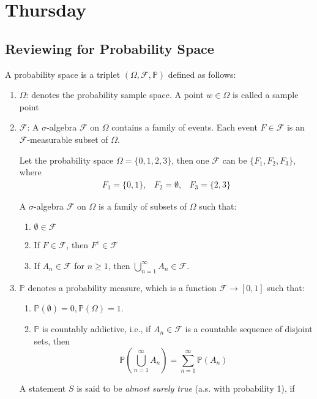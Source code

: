 \section{Thursday}
\subsection{Reviewing for Probability Space}
A probability space is a triplet $(\Omega,\mathcal{F},\mathbb{P})$ defined as follows:
\begin{enumerate}
\item
$\Omega$: denotes the probability sample space. A point $w\in\Omega$ is called a sample point
\item
$\mathcal{F}$: A $\sigma$-algebra $\mathcal{F}$ on $\Omega$ contains a family of events. Each event $F\in\mathcal{F}$ is an $\mathcal{F}$-measurable subset of $\Omega$.
\begin{example}
Let the probability space $\Omega=\{0,1,2,3\}$, then one $\mathcal{F}$ can be $\{F_1,F_2,F_3\}$, where
\[
\begin{array}{lll}
F_1=\{0,1\},
&
F_2=\emptyset,
&
F_3=\{2,3\}
\end{array}
\]
\end{example}
\begin{definition}
A $\sigma$-algebra $\mathcal{F}$ on $\Omega$ is a family of subsets of $\Omega$ such that:
\begin{enumerate}
\item
$\emptyset\in\mathcal{F}$
\item
If $F\in\mathcal{F}$, then $F^c\in\mathcal{F}$
\item
If $A_n\in\mathcal{F}$ for $n\ge1$, then $\bigcup_{n=1}^\infty A_n\in\mathcal{F}$.
\end{enumerate}
\end{definition}
\item
$\mathbb{P}$ denotes a probability measure, which is a function $\mathcal{F}\to[0,1]$ such that:
\begin{enumerate}
\item
$\mathbb{P}(\emptyset)=0,\mathbb{P}(\Omega)=1$.
\item
$\mathbb{P}$ is countably addictive, i.e., if $A_n\in\mathcal{F}$ is a countable sequence of disjoint sets, then
\[
\mathbb{P}\left(\bigcup_{n=1}^\infty A_n\right)=\sum_{n=1}^\infty\mathbb{P}(A_n)
\]
\end{enumerate}
\begin{definition}
A statement $S$ is said to be \emph{almost surely true} (a.s. with probability 1), if

\end{definition}
\end{enumerate}
